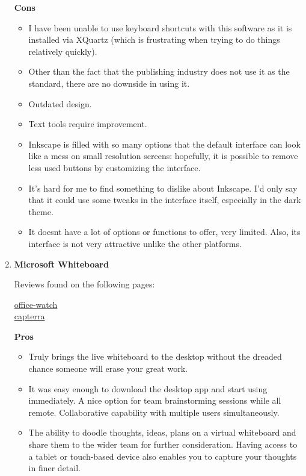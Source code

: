 \documentclass[a4paper,12pt]{article}
\begin{document}
\begin{enumerate}
  \textbf{Cons}
  \begin{itemize}
  \item I have been unable to use keyboard shortcuts with this software as it is installed via XQuartz (which is frustrating when trying to do things relatively quickly).
  \item Other than the fact that the publishing industry does not use it as the standard, there are no downside in using it.
  \item Outdated design.
  \item Text tools require improvement.
  \item Inkscape is filled with so many options that the default interface can look like a mess on small resolution screens: hopefully, it is possible to remove less used buttons by customizing the interface.
  \item It's hard for me to find something to dislike about Inkscape. I'd only say that it could use some tweaks in the interface itself, especially in the dark theme.
  \item It doesnt have a lot of options or functions to offer, very limited. Also, its interface is not very attractive unlike the other platforms.
  \end{itemize}

\item \textbf{Microsoft Whiteboard}

  \vspace{0.1cm}
  Reviews found on the following pages:
  \begin{center}
    \href{https://office-watch.com/2018/microsoft-whiteboard-depth/}{office-watch}\\
    \href{https://www.capterra.com/p/203470/Microsoft-Whiteboard/#reviews}{capterra}\\
  \end{center}

  \textbf{Pros}
  \begin{itemize}
  \item Truly brings the live whiteboard to the desktop without the dreaded chance someone will erase your great work.
  \item It was easy enough to download the desktop app and start using immediately. A nice option for team brainstorming sessions while all remote. Collaborative capability with multiple users simultaneously.
  \item The ability to doodle thoughts, ideas, plans on a virtual whiteboard and share them to the wider team for further consideration. Having access to a tablet or touch-based device also enables you to capture your thoughts in finer detail.
  \end{itemize}
  

\end{enumerate}
\end{document}
